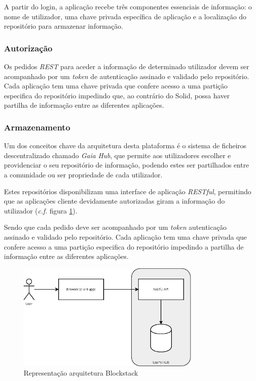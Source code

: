 A partir do login, a aplicação recebe três componentes essenciais de informação: o nome de utilizador, uma chave privada específica de aplicação e a localização do repositório para armazenar informação\cite{blockstack_white_paper}.

\subsubsection{Autorização}
Os pedidos \emph{\acrshort{REST}} para aceder a informação de determinado utilizador devem ser acompanhado por um \emph{token} de autenticação assinado e validado pelo repositório. Cada aplicação tem uma chave privada que confere acesso a uma partição especifica do repositório impedindo que, ao contrário do Solid, possa haver partilha de informação entre as diferentes aplicações.

\subsubsection{Armazenamento}

Um dos conceitos chave da arquitetura desta plataforma é o sistema de ficheiros descentralizado chamado \emph{Gaia Hub}, que permite aos utilizadores escolher e providenciar o seu repositório de informação, podendo estes ser partilhados entre a comunidade ou ser propriedade de cada utilizador.

Estes repositórios disponibilizam uma interface de aplicação \emph{RESTful}, permitindo que as aplicações cliente devidamente autorizadas giram a informação do utilizador (\emph{c.f.} figura \ref{estado_arte_representacao_blockstack}).

Sendo que cada pedido deve ser acompanhado por um \emph{token} autenticação assinado e validado pelo repositório. Cada aplicação tem uma chave privada que confere acesso a uma partição especifica do repositório impedindo a partilha de informação entre as diferentes aplicações\cite{blockstack_white_paper}.

\begin{figure}[H]
    \begin{center}
    \includegraphics[width=0.8\textwidth]{figures/estado_arte-Blockstack.eps}
    \caption{Representação arquitetura Blockstack}
    \label{estado_arte_representacao_blockstack}
    \end{center}
\end{figure}

